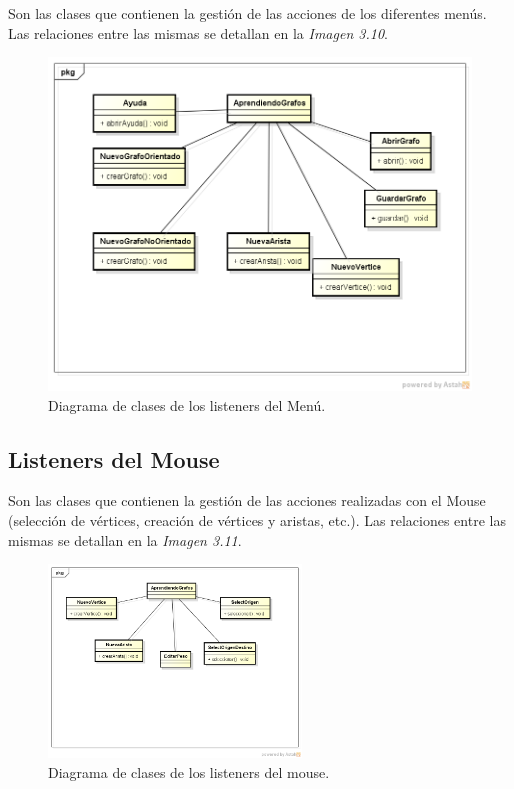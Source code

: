 \documentclass{book}
\begin{document}
Son las clases que contienen la gestión de las acciones de los diferentes menús.
Las relaciones entre las mismas se detallan en la \textit{Imagen 3.10}.
\begin{figure}[H]
	\centering
	\includegraphics[width=1\textwidth]{images/menu.png}
	\medskip
	\caption{Diagrama de clases de los listeners del Menú.}
	\medskip
\end{figure}
\bigskip

\subsection{Listeners del Mouse}

Son las clases que contienen la gestión de las acciones realizadas con el Mouse (selección de vértices, creación de vértices y aristas, etc.).
Las relaciones entre las mismas se detallan en la \textit{Imagen 3.11}.
\begin{figure}[H]
	\centering
	\includegraphics[width=0.6\textwidth]{images/mouse.png}
	\medskip
	\caption{Diagrama de clases de los listeners del mouse.}
	\medskip
\end{figure}
\bigskip
\end{document}
